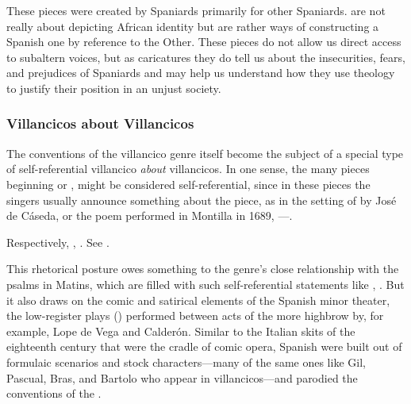 
These pieces were created by Spaniards primarily for other Spaniards.
 are not really about depicting African identity but
are rather ways of constructing a Spanish one by reference to the Other.
These pieces do not allow us direct access to subaltern voices, but as
caricatures they do tell us about the insecurities, fears, and prejudices of
Spaniards and may help us understand how they use theology to justify their
position in an unjust society.

\subsubsection{Villancicos about Villancicos}

The conventions of the villancico genre itself become the subject of a special
type of self-referential villancico \emph{about} villancicos.
In one sense, the many pieces beginning  or , might be considered self-referential, since in these pieces the
singers usually announce something about the piece, as in the setting of
 by José de Cáseda, or the poem performed in
Montilla in 1689, ---.%
\begin{Footnote}
    Respectively, , \autocite[116 (no signature
    listed)]{BNE:VCs17C}.
    See \autocite{LeGuin:Tonadilla}.
\end{Footnote}
This rhetorical posture owes something to the genre's close
relationship with the psalms in Matins, which are filled with such
self-referential statements like ,
.
But it also draws on the comic and satirical elements of the Spanish minor
theater, the low-register plays () performed between acts of
the more highbrow  by, for example, Lope de Vega and Calderón.%
    \Autocite{Cotarelo:Entremeses}
Similar to the Italian  skits of the eighteenth
century that were the cradle of comic opera, Spanish  were
built out of formulaic scenarios and stock characters---many of the same ones
like Gil, Pascual, Bras, and Bartolo who appear in villancicos---and parodied
the conventions of the .


